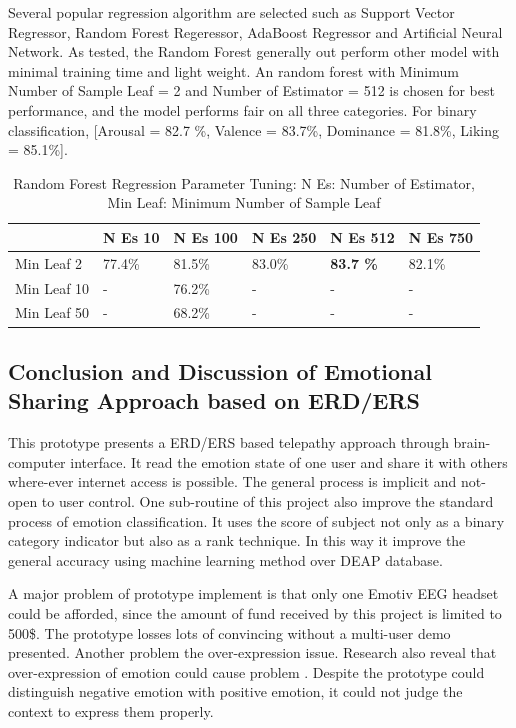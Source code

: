\documentclass[a4paper]{article}
\begin{document}
Several popular regression algorithm are selected such as Support Vector Regressor, Random Forest Regeressor, AdaBoost Regressor and Artificial Neural Network. As tested, the Random Forest generally out perform other model with minimal training time and light weight. An random forest with Minimum Number of Sample Leaf = 2 and Number of Estimator = 512 is chosen for best performance, and the model performs fair on all three categories. For binary classification, [Arousal = 82.7 \%, Valence = 83.7\%, Dominance = 81.8\%, Liking = 85.1\%].

\begin{table}[]
\begin{tabular}{llllll}
\hline
            & N Es 10   & N Es 100  & N Es 250  & N Es 512  & N Es 750  \\ \hline
Min Leaf 2  & 77.4\% & 81.5\% & 83.0\% & \textbf{83.7 \%} & 82.1\% \\ 
Min Leaf 10 & -      & 76.2\% & -      & -      & -      \\
Min Leaf 50 & -      & 68.2\% & -      & -      & -     \\\hline
\end{tabular}
\caption{Random Forest Regression Parameter Tuning: N Es: Number of Estimator, Min Leaf: Minimum Number of Sample Leaf}
\end{table}

\subsection{Conclusion and Discussion of Emotional Sharing Approach based on ERD/ERS}

This prototype presents a ERD/ERS based telepathy approach through brain-computer interface. It read the emotion state of one user and share it with others where-ever internet access is possible. The general process is implicit and not-open to user control. One sub-routine of this project also improve the standard process of emotion classification. It uses the score of subject not only as a binary category indicator but also as a rank technique. In this way it improve the general accuracy using machine learning method over DEAP database.

A major problem of prototype implement is that only one Emotiv EEG headset could be afforded, since the amount of fund received by this project is limited to 500\$. The prototype losses lots of convincing without a multi-user demo presented. Another problem the over-expression issue. Research also reveal that over-expression of emotion could cause problem \autocite{bonanno2004importance}. Despite the prototype could distinguish negative emotion with positive emotion, it could not judge the context to express them properly.
\end{document}

